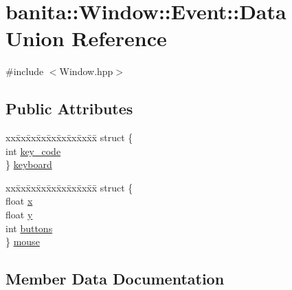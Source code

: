 \hypertarget{unionbanita_1_1_window_1_1_event_1_1_data}{}\section{banita\+::Window\+::Event\+::Data Union Reference}
\label{unionbanita_1_1_window_1_1_event_1_1_data}


{\ttfamily \#include $<$Window.\+hpp$>$}

\subsection*{Public Attributes}
\begin{DoxyCompactItemize}
\item 
\begin{tabbing}
xx\=xx\=xx\=xx\=xx\=xx\=xx\=xx\=xx\=\kill
struct \{\\
\>int \mbox{\hyperlink{unionbanita_1_1_window_1_1_event_1_1_data_af75be0b5f21598b666ffb71a636132b1}{key\_code}}\\
\} \mbox{\hyperlink{unionbanita_1_1_window_1_1_event_1_1_data_adaabd3c433e3fe78c5ed1fd60cf03329}{keyboard}}\\

\end{tabbing}\item 
\begin{tabbing}
xx\=xx\=xx\=xx\=xx\=xx\=xx\=xx\=xx\=\kill
struct \{\\
\>float \mbox{\hyperlink{unionbanita_1_1_window_1_1_event_1_1_data_a44148553673e2932cf2aba87ea2e1628}{x}}\\
\>float \mbox{\hyperlink{unionbanita_1_1_window_1_1_event_1_1_data_af609919ff8743923782aaa2ad5bf49ab}{y}}\\
\>int \mbox{\hyperlink{unionbanita_1_1_window_1_1_event_1_1_data_a969635a652537b04a9f59cdc38251f5a}{buttons}}\\
\} \mbox{\hyperlink{unionbanita_1_1_window_1_1_event_1_1_data_a649a0f5f4ffe82edd5243afdd4d5e10b}{mouse}}\\

\end{tabbing}\end{DoxyCompactItemize}


\subsection{Member Data Documentation}
\mbox{\label{unionbanita_1_1_window_1_1_event_1_1_data_a969635a652537b04a9f59cdc38251f5a}} 

